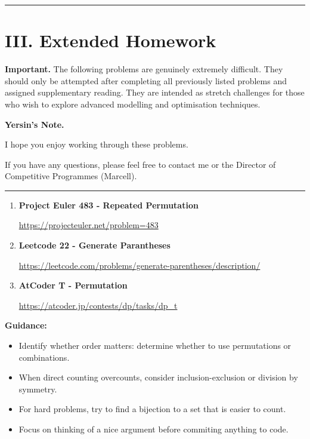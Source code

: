 \documentclass[11pt]{article}
\begin{document}
\vspace{1em}
\hrule
\vspace{1em}

\section*{III. Extended Homework}

\textbf{Important.} The following problems are genuinely extremely difficult.  
They should only be attempted after completing all previously listed problems and assigned supplementary reading.  
They are intended as stretch challenges for those who wish to explore advanced modelling and optimisation techniques.

\medskip

\textbf{Yersin's Note.} 

I hope you enjoy working through these problems.

If you have any questions, please feel free to contact me or the Director of Competitive Programmes (Marcell).

\vspace{0.8em}

\vspace{1em}

\hrule
\vspace{1em}

\begin{enumerate}
    \item \textbf{Project Euler 483 - Repeated Permutation}
    
    \vspace{0.3em}
    {\url{https://projecteuler.net/problem=483}}
                \vspace{0.8em}

    \item \textbf{Leetcode 22 - Generate Parantheses}
    
    \vspace{0.3em}
    {\url{https://leetcode.com/problems/generate-parentheses/description/}}
                \vspace{0.8em} 
          

    \item \textbf{AtCoder T - Permutation}
    
    \vspace{0.3em}
    {\url{https://atcoder.jp/contests/dp/tasks/dp_t}}
\end{enumerate}

\noindent
\textbf{Guidance:}
\begin{itemize}
    \item Identify whether order matters: determine whether to use permutations or combinations.
    \item When direct counting overcounts, consider inclusion-exclusion or division by symmetry.
    \item For hard problems, try to find a bijection to a set that is easier to count.
    \item Focus on thinking of a nice argument before commiting anything to code.
\end{itemize}
\end{document}
